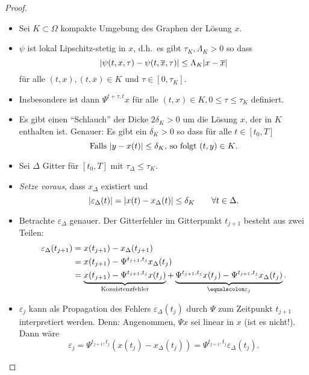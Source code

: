 \begin{proof}
	\begin{itemize}[leftmargin=*]
		\item Sei $K \subset \Omega$ kompakte Umgebung des Graphen der Lösung $x$.
		\item $\psi$ ist lokal Lipschitz-stetig in $x$, d.h.\ es gibt $\tau_K, \Lambda_K > 0$ so dass
		\begin{equation*}
			\lvert \psi (t,x,\tau )-\psi (t,\overline{x},\tau ) \rvert \leq \Lambda_K \lvert x-\overline{x} \rvert
		\end{equation*}
		für alle $(t,x),(t,\overline{x}) \in K$ und $\tau \in [0,\tau_K]$.
		\item Insbesondere ist dann $\Psi^{t+\tau,t} x$ für alle $(t,x) \in K,0 \leq \tau \leq \tau_K$ definiert.
		\item Es gibt einen \enquote{Schlauch} der Dicke $2 \delta_K>0$ um die Lösung $x$, der in $K$ enthalten ist.
		Genauer: Es gibt ein $\delta_K > 0$ so dass für alle $t \in [t_0,T]$
		\begin{equation*}
			\text{Falls $\lvert y-x(t) \rvert \leq \delta_K$, so folgt $(t,y) \in K$.}
		\end{equation*}
		\item Sei $\Delta$ Gitter für $[t_0,T ]$ mit $\tau_{\Delta} \leq \tau_K$.
		\item \textit{Setze voraus}, dass $x_\Delta$ existiert und
		\begin{equation*}
			\lvert \varepsilon_{\Delta} (t) \rvert
			=
			\lvert x(t)-x_{\Delta} (t) \rvert \leq \delta_K \qquad \forall t \in \Delta.
		\end{equation*}
		\item Betrachte $\varepsilon_{\Delta}$ genauer.  Der Gitterfehler im Gitterpunkt $t_{j+1}$ besteht aus
		zwei Teilen:
		\begin{align*}
			\varepsilon_{\Delta} (t_{j+1}) & =x (t_{j+1})-x_{\Delta} (t_{j+1}) \\
			& = x (t_{j+1})-\Psi^{t_{j+1},t_j} x_{\Delta} (t_j) \\
			& = \underbrace{x(t_{j+1})-\Psi^{t_{j+1},t_j} x (t_j)}_{\text{Konsistenzfehler}}
			+\underbrace{\Psi^{t_{j+1},t_j} x (t_j)-\Psi^{t_{j+1},t_j} x_{\Delta} (t_j)}_{\equalscolon \varepsilon_j}.
		\end{align*}
		\item $\varepsilon_j$ kann als Propagation des Fehlers $\varepsilon_{\Delta} (t_j)$
		durch $\Psi$ zum Zeitpunkt $t_{j+1}$ interpretiert werden.
		Denn: Angenommen, $\Psi x$ sei linear in $x$ (ist es nicht!). Dann wäre
		\begin{equation*}
			\varepsilon_j=\Psi^{t_{j+1},t_j} (x(t_j)-x_{\Delta} (t_j)) =\Psi^{t_{j+1},t_j} \varepsilon_{\Delta} (t_j).
		\end{equation*}
		

\end{itemize}
\end{proof}
